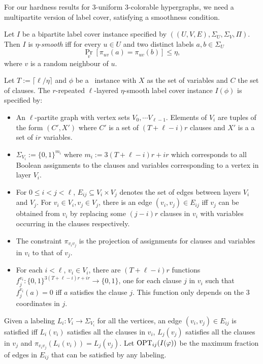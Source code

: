  For our hardness results for
$3$-uniform $3$-colorable hypergraphs, we need a multipartite version of label
cover, satisfying a smoothness condition. 
\begin{definition}
Let $I$ be a bipartite label cover instance specified by
$\left((U,V,E),\Sigma_U,\Sigma_V,\Pi\right)$. Then $I$ is $\eta$-\emph{smooth}
iff for every $u \in U$ and two distinct labels $a,b \in \Sigma_U$ 
$$\Pr_v[\pi_{uv}(a) = \pi_{uv}(b) ] \leq \eta,$$ 
where $v$ is a random neighbour of $u$.
\end{definition} 
\begin{definition}
\label{def:multilayer} 
Let $T:=\lceil\ell/\eta\rceil$ and $\phi$ be
a \TSAT\ instance with $X$ as the set of variables and $C$ the set of clauses.
The $r$-repeated $\ell$-layered $\eta$-smooth label cover instance $I(\phi)$ is
specified by: 
\begin{itemize} 
\item An $\ell$-partite graph with vertex sets
$V_0, \cdots V_{\ell-1}$. Elements of $V_i$ are tuples of the form $(C',X')$
where $C'$ is a set of $(T+\ell - i)r$ clauses and $X'$ is a a set of $ir$
variables. 
\item $\Sigma_{V_i} := \{0,1\}^{m_i}$ where $m_i:={3(T+\ell - i)r
+ir}$ which corresponds to all Boolean assignments to the clauses and variables
corresponding to a vertex in layer $V_i$. 
\item For $0 \leq i < j < \ell$,
$E_{ij} \subseteq V_i \times V_j$ denotes the set of edges between layers $V_i$
and $V_j$. For $v_i \in V_i, v_j \in V_j$, there is an edge $(v_i,v_j) \in
E_{ij}$ iff $v_j$ can be obtained from $v_i$ by replacing some $(j-i)r$ clauses
in $v_i$ with variables occurring in the clauses respectively. 
\item The
constraint $\pi_{v_i v_j}$ is the projection of assignments for clauses and
variables in $v_i$ to that of $v_j$. 
\item For each $i <\ell$, $v_i \in V_i$,
there are $(T+\ell - i)r$ functions $f_j^{v_i}:\{0,1\}^{3(T+\ell - i)r
+ir}\rightarrow \{0,1\}$, one for each clause $j$ in $v_i$ such that
$f_j^{v_i}(a)=0$ iff $a$ satisfies the clause $j$. This function only depends on
the $3$ coordinates in $j$. \end{itemize} Given a labeling $L_i:V_i\rightarrow
\Sigma_{V_i}$ for all the vertices, an edge $(v_i,v_j) \in E_{ij}$ is satisfied
iff $L_i(v_i)$ satisfies all the clauses in $v_i$, $L_j(v_j)$ satisfies all the
clauses in $v_j$ and $\pi_{v_i v_j}(L_i(v_i)) = L_j(v_j)$. Let
$\textnormal{OPT}_{ij}(I(\varphi))$ be the maximum fraction of edges in $E_{ij}$ that can be
satisfied by any labeling. 
\end{definition} 
